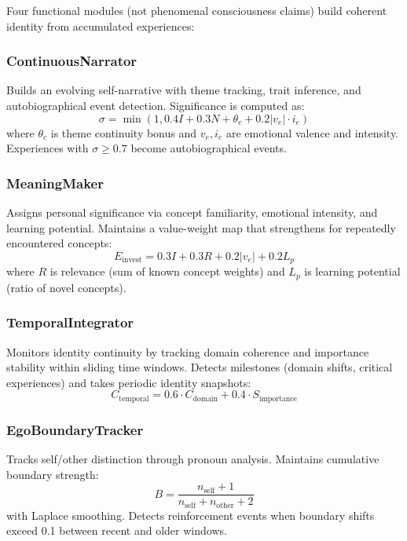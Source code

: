 \documentclass[conference]{IEEEtran}
\begin{document}
Four functional modules (not phenomenal consciousness claims) build coherent identity from accumulated experiences:

\subsubsection{ContinuousNarrator}
Builds an evolving self-narrative with theme tracking, trait inference, and autobiographical event detection. Significance is computed as:
\begin{equation}
    \sigma = \min\!\left(1, 0.4I + 0.3N + \theta_c + 0.2|v_e| \cdot i_e\right)
\end{equation}
where $\theta_c$ is theme continuity bonus and $v_e, i_e$ are emotional valence and intensity. Experiences with $\sigma \geq 0.7$ become autobiographical events.

\subsubsection{MeaningMaker}
Assigns personal significance via concept familiarity, emotional intensity, and learning potential. Maintains a value-weight map that strengthens for repeatedly encountered concepts:
\begin{equation}
    E_\text{invest} = 0.3I + 0.3R + 0.2|v_e| + 0.2L_p
\end{equation}
where $R$ is relevance (sum of known concept weights) and $L_p$ is learning potential (ratio of novel concepts).

\subsubsection{TemporalIntegrator}
Monitors identity continuity by tracking domain coherence and importance stability within sliding time windows. Detects milestones (domain shifts, critical experiences) and takes periodic identity snapshots:
\begin{equation}
    C_\text{temporal} = 0.6 \cdot C_\text{domain} + 0.4 \cdot S_\text{importance}
\end{equation}

\subsubsection{EgoBoundaryTracker}
Tracks self/other distinction through pronoun analysis. Maintains cumulative boundary strength:
\begin{equation}
    B = \frac{n_\text{self} + 1}{n_\text{self} + n_\text{other} + 2}
\end{equation}
with Laplace smoothing. Detects reinforcement events when boundary shifts exceed 0.1 between recent and older windows.
\end{document}
